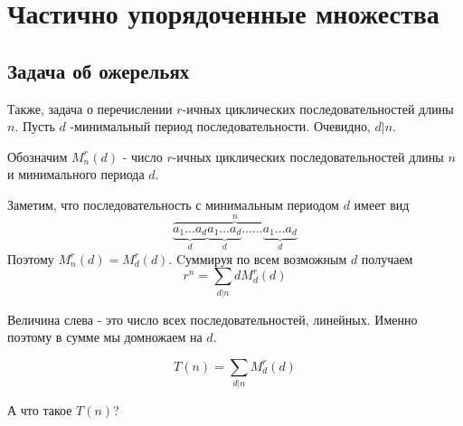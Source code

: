 \documentclass[unicode, 10pt, a4paper, oneside, fleqn]{article}
\begin{document}
\section{Частично упорядоченные множества}
\subsection{Задача об ожерельях}
Также, задача о перечислении $r$-ичных циклических последовательностей длины $n$.
Пусть $d$ -минимальный период последовательности. Очевидно, $d|n$.
\begin{denote}
  Обозначим $M_n^r(d)$ - число $r$-ичных циклических последовательностей длины $n$ и минимального
  периода $d$.
\end{denote}
Заметим, что последовательность 
с минимальным периодом $d$ имеет вид 
\begin{displaymath}
  \overbrace{\underbrace{a_1\dots a_d}_{d}\underbrace{a_1\dots a_d}_{d}\dots\dots \underbrace{a_1\dots a_d}_{d}}^n
\end{displaymath}
Поэтому $M_n^r(d) = M_d^r(d)$. Cуммируя по всем возможным $d$ получаем
$$r^n=\sum\limits_{d|n}dM_d^r(d)$$
\begin{authornote}
  Величина слева - это число всех последовательностей, линейных. Именно поэтому в сумме мы домножаем на $d$.
\end{authornote}
\begin{displaymath}
  T(n) = \sum\limits_{d|n}M_d^r(d) 
\end{displaymath}
\begin{authornote}
А что такое $T(n)$?
\end{authornote}
\end{document}
